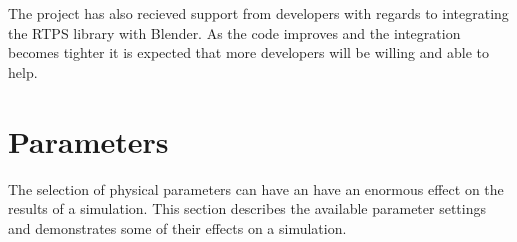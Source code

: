 The project has also recieved support from developers with regards to
integrating the RTPS library with Blender. As the code improves and the
integration becomes tighter it is expected that more developers will be willing
and able to help.

\section{Parameters}

The selection of physical parameters can have an have an enormous effect on the
results of a simulation. This section describes the available parameter
settings and demonstrates some of their effects on a simulation.




